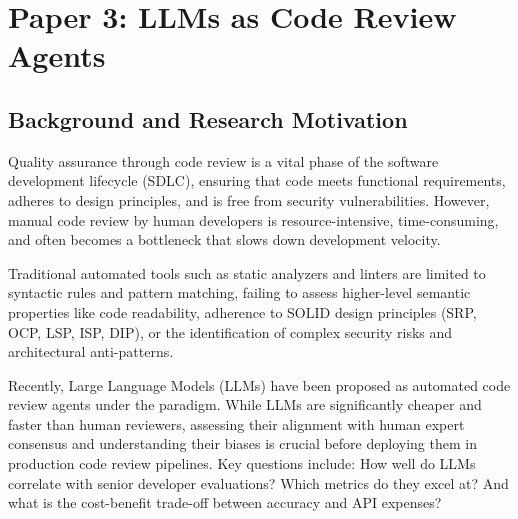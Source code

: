 
\section{Paper 3: LLMs as Code Review Agents}
\label{sec:llm_review}


\subsection{Background and Research Motivation}
Quality assurance through code review is a vital phase of the software development lifecycle (SDLC), ensuring that code meets functional requirements, adheres to design principles, and is free from security vulnerabilities. However, manual code review by human developers is resource-intensive, time-consuming, and often becomes a bottleneck that slows down development velocity.

Traditional automated tools such as static analyzers and linters are limited to syntactic rules and pattern matching, failing to assess higher-level semantic properties like code readability, adherence to SOLID design principles (SRP, OCP, LSP, ISP, DIP), or the identification of complex security risks and architectural anti-patterns.

Recently, Large Language Models (LLMs) have been proposed as automated code review agents under the  paradigm. While LLMs are significantly cheaper and faster than human reviewers, assessing their alignment with human expert consensus and understanding their biases is crucial before deploying them in production code review pipelines. Key questions include: How well do LLMs correlate with senior developer evaluations? Which metrics do they excel at? And what is the cost-benefit trade-off between accuracy and API expenses?

